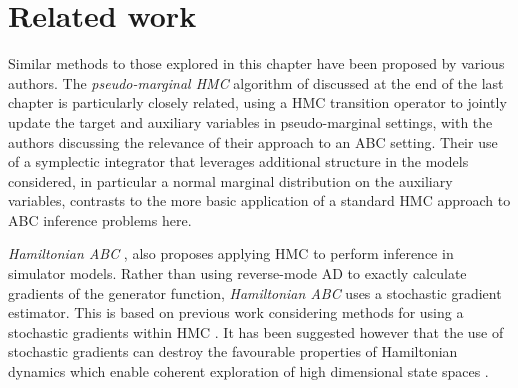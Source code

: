 

\section{Related work}

Similar methods to those explored in this chapter have been proposed by various authors. The \emph{pseudo-marginal \ac{HMC}} algorithm of \citep{lindsten2016pseudo} discussed at the end of the last chapter is particularly closely related, using a \ac{HMC} transition operator to jointly update the target and auxiliary variables in pseudo-marginal settings, with the authors discussing the relevance of their approach to an \ac{ABC} setting. Their use of a symplectic integrator that leverages additional structure in the models considered, in particular a normal marginal distribution on the auxiliary variables, contrasts to the more basic application of a standard \ac{HMC} approach to \ac{ABC} inference problems here. 

\emph{Hamiltonian ABC} \cite{meeds2015hamiltonian}, also proposes applying \ac{HMC} to perform inference in simulator models. Rather than using reverse-mode \ac{AD} to exactly calculate gradients of the generator function, \emph{Hamiltonian ABC} uses a stochastic gradient estimator. This is based on previous work considering methods for using a stochastic gradients within \ac{HMC} \citep{welling2011bayesian,chen2014stochastic}. It has been suggested however that the use of stochastic gradients can destroy the favourable properties of Hamiltonian dynamics which enable coherent exploration of high dimensional state spaces \citep{betancourt2015fundamental}. 

